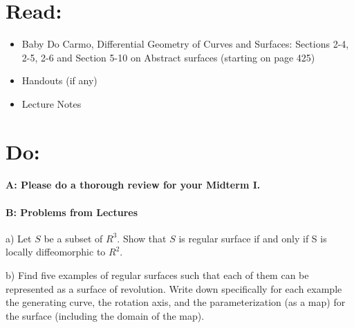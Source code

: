 \documentclass[12pt]{article}
\title{\rightline {\Huge {}}}
\author{\LARGE {HMC\quad Math 142 \quad Fall 2026} 
\\ {Prof. Gu}  
\\ {\LARGE Problem Set 6}}
\date{Start this assignment before Sunday night!}
\begin{document}
\maketitle

\section*{ Read: }

\begin{itemize}
	\item{Baby Do Carmo, Differential Geometry
		      of Curves and Surfaces:
		      Sections 2-4, 2-5, 2-6 and Section 5-10 on Abstract surfaces (starting
		      on page 425)}
	\item{Handouts (if any)}
	\item{Lecture Notes}
\end{itemize}

\section*{ Do: }
\paragraph{A: Please do a thorough review for your Midterm I.}

\medskip
\paragraph{B: Problems from Lectures}

\begin{itemize}
	{\item a) Let $S$ be a subset of $R^3$.  Show that $S$ is
		regular surface if and only if S is locally diffeomorphic
		to $R^2$.}

	{\item b) Find five examples of regular surfaces such that each of
		them can be represented as a surface of revolution.  Write down
		specifically for each example the generating curve, the rotation
		axis, and the parameterization (as a map) for the surface (including
		the domain of the map).}

\end{itemize}
\end{document}
